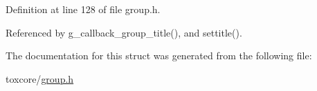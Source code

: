 Definition at line 128 of file group.\+h.



Referenced by g\+\_\+callback\+\_\+group\+\_\+title(), and settitle().



The documentation for this struct was generated from the following file\+:\begin{DoxyCompactItemize}
\item 
toxcore/\hyperlink{toxcore_2group_8h}{group.\+h}\end{DoxyCompactItemize}
